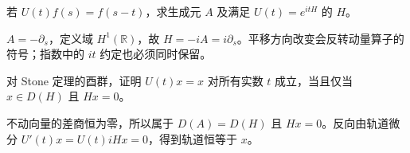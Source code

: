 \begin{exercise}[核对符号]\label{ex:y9-stone-sign}
若 $U(t)f(s)=f(s-t)$，求生成元 $A$ 及满足 $U(t)=e^{itH}$ 的 $H$。
\end{exercise}
\begin{solution}
$A=-\partial_s$，定义域 $H^1(\mathbb R)$，故 $H=-iA=i\partial_s$。平移方向改变会反转动量算子的符号；指数中的 $it$ 约定也必须同时保留。
\end{solution}

\begin{exercise}[不动向量与零能量]\label{ex:y9-stone-fixed}
对 Stone 定理的酉群，证明 $U(t)x=x$ 对所有实数 $t$ 成立，当且仅当 $x\in D(H)$ 且 $Hx=0$。
\end{exercise}
\begin{solution}
不动向量的差商恒为零，所以属于 $D(A)=D(H)$ 且 $Hx=0$。反向由轨道微分 $U'(t)x=U(t)iHx=0$，得到轨道恒等于 $x$。
\end{solution}
